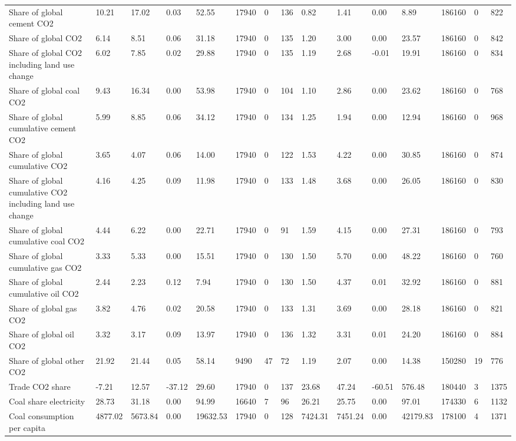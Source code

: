 \begin{longtable}{lllllllllllllll}
Share of global cement CO2 & 10.21 & 17.02 & 0.03 & 52.55 & 17940 & 0 & 136 & 0.82 & 1.41 & 0.00 & 8.89 & 186160 & 0 & 822\\
Share of global CO2 & 6.14 & 8.51 & 0.06 & 31.18 & 17940 & 0 & 135 & 1.20 & 3.00 & 0.00 & 23.57 & 186160 & 0 & 842\\
Share of global CO2 including land use change & 6.02 & 7.85 & 0.02 & 29.88 & 17940 & 0 & 135 & 1.19 & 2.68 & -0.01 & 19.91 & 186160 & 0 & 834\\
Share of global coal CO2 & 9.43 & 16.34 & 0.00 & 53.98 & 17940 & 0 & 104 & 1.10 & 2.86 & 0.00 & 23.62 & 186160 & 0 & 768\\
\addlinespace
Share of global cumulative cement CO2 & 5.99 & 8.85 & 0.06 & 34.12 & 17940 & 0 & 134 & 1.25 & 1.94 & 0.00 & 12.94 & 186160 & 0 & 968\\
Share of global cumulative CO2 & 3.65 & 4.07 & 0.06 & 14.00 & 17940 & 0 & 122 & 1.53 & 4.22 & 0.00 & 30.85 & 186160 & 0 & 874\\
Share of global cumulative CO2 including land use change & 4.16 & 4.25 & 0.09 & 11.98 & 17940 & 0 & 133 & 1.48 & 3.68 & 0.00 & 26.05 & 186160 & 0 & 830\\
Share of global cumulative coal CO2 & 4.44 & 6.22 & 0.00 & 22.71 & 17940 & 0 & 91 & 1.59 & 4.15 & 0.00 & 27.31 & 186160 & 0 & 793\\
Share of global cumulative gas CO2 & 3.33 & 5.33 & 0.00 & 15.51 & 17940 & 0 & 130 & 1.50 & 5.70 & 0.00 & 48.22 & 186160 & 0 & 760\\
\addlinespace
Share of global cumulative oil CO2 & 2.44 & 2.23 & 0.12 & 7.94 & 17940 & 0 & 130 & 1.50 & 4.37 & 0.01 & 32.92 & 186160 & 0 & 881\\
Share of global gas CO2 & 3.82 & 4.76 & 0.02 & 20.58 & 17940 & 0 & 133 & 1.31 & 3.69 & 0.00 & 28.18 & 186160 & 0 & 821\\
Share of global oil CO2 & 3.32 & 3.17 & 0.09 & 13.97 & 17940 & 0 & 136 & 1.32 & 3.31 & 0.01 & 24.20 & 186160 & 0 & 884\\
Share of global other CO2 & 21.92 & 21.44 & 0.05 & 58.14 & 9490 & 47 & 72 & 1.19 & 2.07 & 0.00 & 14.38 & 150280 & 19 & 776\\
Trade CO2 share & -7.21 & 12.57 & -37.12 & 29.60 & 17940 & 0 & 137 & 23.68 & 47.24 & -60.51 & 576.48 & 180440 & 3 & 1375\\
\addlinespace
Coal share electricity & 28.73 & 31.18 & 0.00 & 94.99 & 16640 & 7 & 96 & 26.21 & 25.75 & 0.00 & 97.01 & 174330 & 6 & 1132\\
Coal consumption per capita & 4877.02 & 5673.84 & 0.00 & 19632.53 & 17940 & 0 & 128 & 7424.31 & 7451.24 & 0.00 & 42179.83 & 178100 & 4 & 1371\\

\end{longtable}
